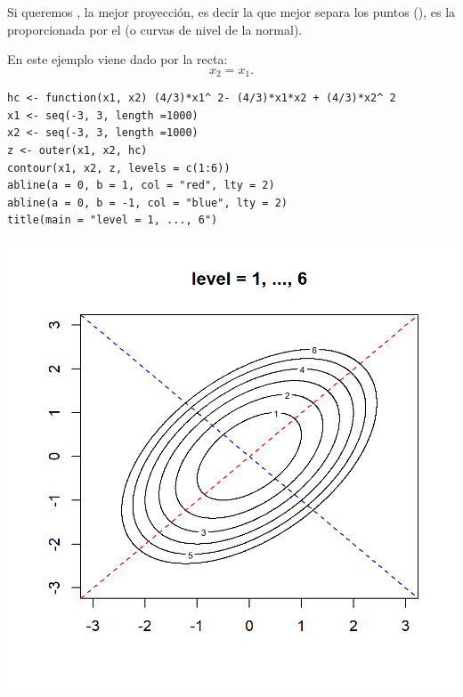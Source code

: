 \begin{minipage}{0.45\textwidth}
	Si queremos , la mejor proyección, es decir la que mejor separa los puntos (), es la proporcionada por el  (o curvas de nivel de la normal).
	
	En este ejemplo viene dado por la recta: \[ x_2=x_1. \]
\end{minipage}\qquad\begin{minipage}{0.5\textwidth}
\begin{lstlisting}
hc <- function(x1, x2) (4/3)*x1^ 2- (4/3)*x1*x2 + (4/3)*x2^ 2
x1 <- seq(-3, 3, length =1000)
x2 <- seq(-3, 3, length =1000)
z <- outer(x1, x2, hc)
contour(x1, x2, z, levels = c(1:6))
abline(a = 0, b = 1, col = "red", lty = 2)
abline(a = 0, b = -1, col = "blue", lty = 2)
title(main = "level = 1, ..., 6")
\end{lstlisting}
\end{minipage}
\begin{flushright}
\includegraphics[width=0.5\linewidth]{"Temas/Imágenes/Tema 4/screenshot003"}
\end{flushright}